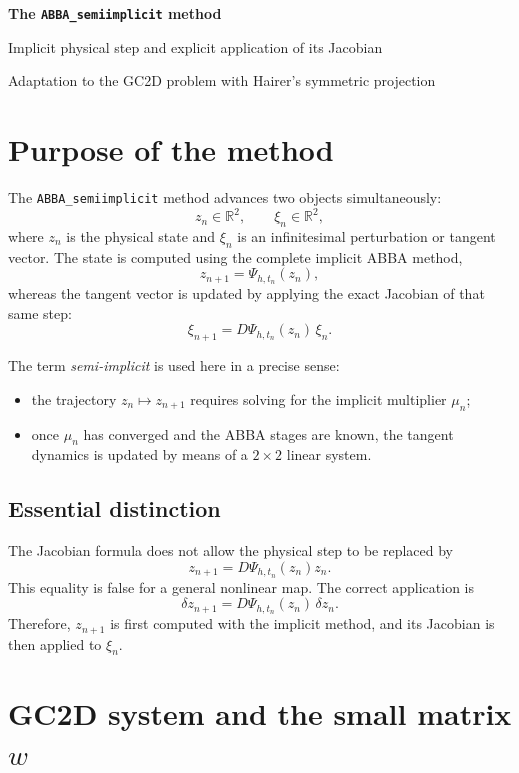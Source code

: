 \documentclass[11pt,a4paper]{article}
\newcommand{\R}{\mathbb{R}}
\begin{document}
\begin{center}
  {\LARGE\bfseries\color{azul}The \texttt{ABBA\_semiimplicit} method}\par
  \vspace{0.35em}
  {\large Implicit physical step and explicit application of its Jacobian}\par
  \vspace{0.45em}
  {\small Adaptation to the GC2D problem with Hairer's symmetric projection}
\end{center}

\vspace{0.5em}

\section{Purpose of the method}

The \texttt{ABBA\_semiimplicit} method advances two objects simultaneously:
\[
 z_n\in\R^2,
 \qquad
 \xi_n\in\R^2,
\]
where $z_n$ is the physical state and $\xi_n$ is an infinitesimal perturbation or tangent
vector. The state is computed using the complete implicit ABBA method,
\[
 z_{n+1}=\Psi_{h,t_n}(z_n),
\]
whereas the tangent vector is updated by applying the exact Jacobian of that same step:
\[
 \boxed{
 \xi_{n+1}=D\Psi_{h,t_n}(z_n)\,\xi_n.
 }
\]

The term \emph{semi-implicit} is used here in a precise sense:
\begin{itemize}
 \item the trajectory $z_n\mapsto z_{n+1}$ requires solving for the implicit multiplier
       $\mu_n$;
 \item once $\mu_n$ has converged and the ABBA stages are known, the tangent dynamics is
       updated by means of a $2\times2$ linear system.
\end{itemize}

\subsection*{Essential distinction}

The Jacobian formula does not allow the physical step to be replaced by
\[
 z_{n+1}=D\Psi_{h,t_n}(z_n)z_n.
\]
This equality is false for a general nonlinear map. The correct application is
\[
 \delta z_{n+1}=D\Psi_{h,t_n}(z_n)\,\delta z_n.
\]
Therefore, $z_{n+1}$ is first computed with the implicit method, and its Jacobian is then
applied to $\xi_n$.

\section{GC2D system and the small matrix \texorpdfstring{$w$}{w}}
\end{document}
